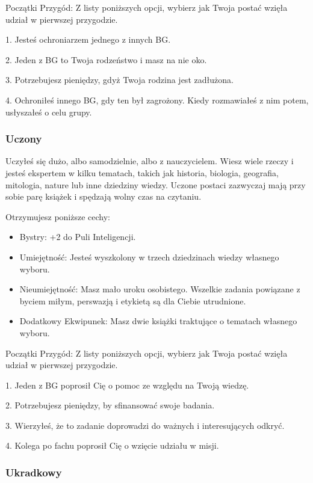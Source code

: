 Początki Przygód: Z listy poniższych opcji, wybierz jak Twoja postać wzięła udział w pierwszej przygodzie.

1. Jesteś ochroniarzem jednego z innych BG.

2. Jeden z BG to Twoja rodzeństwo i masz na nie oko.

3. Potrzebujesz pieniędzy, gdyż Twoja rodzina jest zadłużona.

4. Ochroniłeś innego BG, gdy ten był zagrożony. Kiedy rozmawiałeś z nim potem, usłyszałeś o celu grupy. 

\subsubsection{Uczony}

Uczyłeś się dużo, albo samodzielnie, albo z nauczycielem. Wiesz wiele rzeczy i jesteś ekspertem w kilku tematach, takich jak historia, biologia, geografia, mitologia, nature lub inne dziedziny wiedzy. Uczone postaci zazwyczaj mają przy sobie parę książek i spędzają wolny czas na czytaniu.

Otrzymujesz poniższe cechy:
\begin{itemize}
    \item  Bystry: +2 do Puli Inteligencji.
    \item  Umiejętność: Jesteś wyszkolony w trzech dziedzinach wiedzy własnego wyboru.
    \item  Nieumiejętność: Masz mało uroku osobistego. Wszelkie zadania powiązane z byciem miłym, perswazją i etykietą są dla Ciebie utrudnione.
    \item  Dodatkowy Ekwipunek: Masz dwie książki traktujące o tematach własnego wyboru.
\end{itemize}

Początki Przygód: Z listy poniższych opcji, wybierz jak Twoja postać wzięła udział w pierwszej przygodzie.

1. Jeden z BG poprosił Cię o pomoc ze względu na Twoją wiedzę.

2. Potrzebujesz pieniędzy, by sfinansować swoje badania.

3. Wierzyłeś, że to zadanie doprowadzi do ważnych i interesujących odkryć.

4. Kolega po fachu poprosił Cię o wzięcie udziału w misji.

\subsubsection{Ukradkowy}

